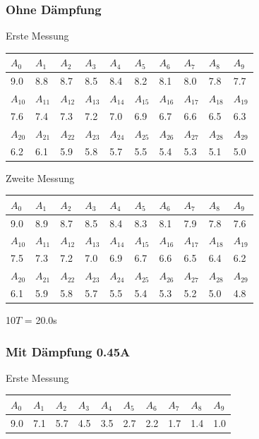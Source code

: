 \documentclass[12pt,a4paper]{article}
\begin{document}
\subsubsection*{Ohne D\"ampfung}
Erste Messung

\vspace{3pt}
\begin{tabular}{|l|l|l|l|l|l|l|l|l|l|}
\hline
$A_{0}$&$A_{1}$&$A_{2}$&$A_{3}$&$A_{4}$&$A_{5}$&$A_{6}$&$A_{7}$&$A_{8}$&$A_{9}$\\
\hline
9.0&8.8&8.7&8.5&8.4&8.2&8.1&8.0&7.8&7.7\\
\hline
\hline
$A_{10}$&$A_{11}$&$A_{12}$&$A_{13}$&$A_{14}$&$A_{15}$&$A_{16}$&$A_{17}$&$A_{18}$&$A_{19}$\\
\hline
7.6&7.4&7.3&7.2&7.0&6.9&6.7&6.6&6.5&6.3\\
\hline
\hline
$A_{20}$&$A_{21}$&$A_{22}$&$A_{23}$&$A_{24}$&$A_{25}$&$A_{26}$&$A_{27}$&$A_{28}$&$A_{29}$\\
\hline
6.2&6.1&5.9&5.8&5.7&5.5&5.4&5.3&5.1&5.0\\
\hline
\end{tabular}

\vspace{10pt}
Zweite Messung

\vspace{3pt}
\begin{tabular}{|l|l|l|l|l|l|l|l|l|l|}
\hline
$A_{0}$&$A_{1}$&$A_{2}$&$A_{3}$&$A_{4}$&$A_{5}$&$A_{6}$&$A_{7}$&$A_{8}$&$A_{9}$\\
\hline
9.0&8.9&8.7&8.5&8.4&8.3&8.1&7.9&7.8&7.6\\
\hline
\hline
$A_{10}$&$A_{11}$&$A_{12}$&$A_{13}$&$A_{14}$&$A_{15}$&$A_{16}$&$A_{17}$&$A_{18}$&$A_{19}$\\
\hline
7.5&7.3&7.2&7.0&6.9&6.7&6.6&6.5&6.4&6.2\\
\hline
\hline
$A_{20}$&$A_{21}$&$A_{22}$&$A_{23}$&$A_{24}$&$A_{25}$&$A_{26}$&$A_{27}$&$A_{28}$&$A_{29}$\\
\hline
6.1&5.9&5.8&5.7&5.5&5.4&5.3&5.2&5.0&4.8\\
\hline
\end{tabular}

\vspace{10pt}
10$T$ = 20.0s

\subsubsection*{Mit D\"ampfung 0.45A}
Erste Messung

\vspace{3pt}
\begin{tabular}{|l|l|l|l|l|l|l|l|l|l|}
\hline
$A_{0}$&$A_{1}$&$A_{2}$&$A_{3}$&$A_{4}$&$A_{5}$&$A_{6}$&$A_{7}$&$A_{8}$&$A_{9}$\\
\hline
9.0&7.1&5.7&4.5&3.5&2.7&2.2&1.7&1.4&1.0\\
\hline
\end{tabular}
\end{document}
